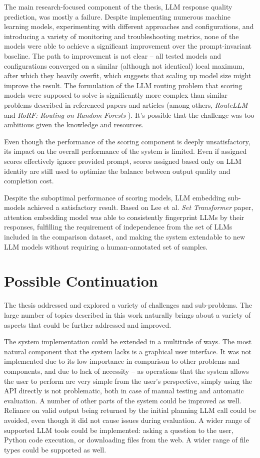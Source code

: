 \documentclass[a4paper,11pt,twoside]{report}
\theoremstyle{definition}
\begin{document}
The main research-focused component of the thesis, LLM response quality prediction, was mostly a failure. Despite implementing numerous machine learning models, experimenting with different approaches and configurations, and introducing a variety of monitoring and troubleshooting metrics, none of the models were able to achieve a significant improvement over the prompt-invariant baseline. The path to improvement is not clear -- all tested models and configurations converged on a similar (although not identical) local maximum, after which they heavily overfit, which suggests that scaling up model size might improve the result. The formulation of the LLM routing problem that scoring models were supposed to solve is significantly more complex than similar problems described in referenced papers and articles (among others, \textit{RouteLLM} \cite{ong2025routellm} and \textit{RoRF: Routing on Random Forests} \cite{notdiamond2024rorf}). It's possible that the challenge was too ambitious given the knowledge and resources. 

Even though the performance of the scoring component is deeply unsatisfactory, its impact on the overall performance of the system is limited. Even if assigned scores effectively ignore provided prompt, scores assigned based only on LLM identity are still used to optimize the balance between output quality and completion cost.

Despite the suboptimal performance of scoring models, LLM embedding sub-models achieved a satisfactory result. Based on Lee et al. \textit{Set Transformer} paper, attention embedding model was able to consistently fingerprint LLMs by their responses, fulfilling the requirement of independence from the set of LLMs included in the comparison dataset, and making the system extendable to new LLM models without requiring a human-annotated set of samples.

\section{Possible Continuation}

The thesis addressed and explored a variety of challenges and sub-problems. The large number of topics described in this work naturally brings about a variety of aspects that could be further addressed and improved.

The system implementation could be extended in a multitude of ways. The most natural component that the system lacks is a graphical user interface. It was not implemented due to its low importance in comparison to other problems and components, and due to lack of necessity -- as operations that the system allows the user to perform are very simple from the user's perspective, simply using the API directly is not problematic, both in case of manual testing and automatic evaluation. A number of other parts of the system could be improved as well. Reliance on valid output being returned by the initial planning LLM call could be avoided, even though it did not cause issues during evaluation. A wider range of supported LLM tools could be implemented: asking a question to the user, Python code execution, or downloading files from the web. A wider range of file types could be supported as well.
\end{document}
